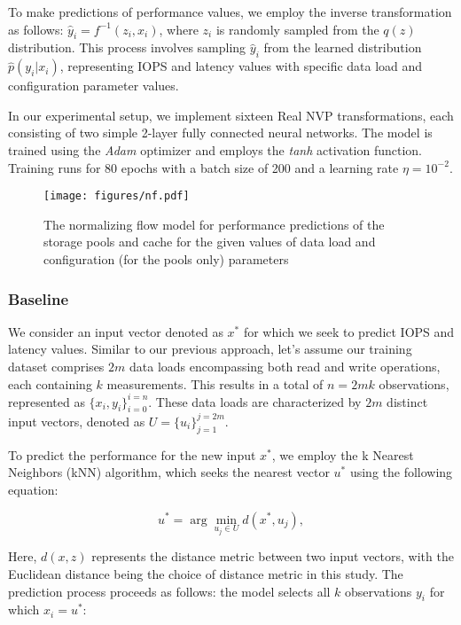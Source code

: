 To make predictions of performance values, we employ the inverse transformation as follows: $\hat{y}_i=f^{-1}(z_i, x_i)$, where $z_i$ is randomly sampled from the $q(z)$ distribution. This process involves sampling $\hat{y}_i$ from the learned distribution $\hat{p}(y_i|x_i)$, representing IOPS and latency values with specific data load and configuration parameter values.

In our experimental setup, we implement sixteen Real NVP transformations, each consisting of two simple 2-layer fully connected neural networks. The model is trained using the {\it Adam} optimizer and employs the {\it tanh} activation function. Training runs for 80 epochs with a batch size of 200 and a learning rate $\eta = 10^{-2}$.

\begin{figure*}
\centerline{\texttt{[image: figures/nf.pdf]}}
\caption{The normalizing flow model for performance predictions of the storage pools and cache for the given values of data load and configuration (for the pools only) parameters}
\label{fig:nf}
\end{figure*}

\subsubsection{Baseline}

We consider an input vector denoted as $x^{*}$ for which we seek to predict IOPS and latency values. Similar to our previous approach, let's assume our training dataset comprises $2m$ data loads encompassing both read and write operations, each containing $k$ measurements. This results in a total of $n=2mk$ observations, represented as $\{x_i, y_i\}_{i=0}^{i=n}$. These data loads are characterized by $2m$ distinct input vectors, denoted as $U=\{u_i\}_{j=1}^{j=2m}$.

To predict the performance for the new input $x^{*}$, we employ the k Nearest Neighbors (kNN) algorithm, which seeks the nearest vector $u^{*}$ using the following equation:

\begin{equation}
u^{*} = \arg \min_{u_j \in U} d(x^{*}, u_j),
\end{equation}

Here, $d(x, z)$ represents the distance metric between two input vectors, with the Euclidean distance being the choice of distance metric in this study. The prediction process proceeds as follows: the model selects all $k$ observations $y_i$ for which $x_i=u^{*}$:

